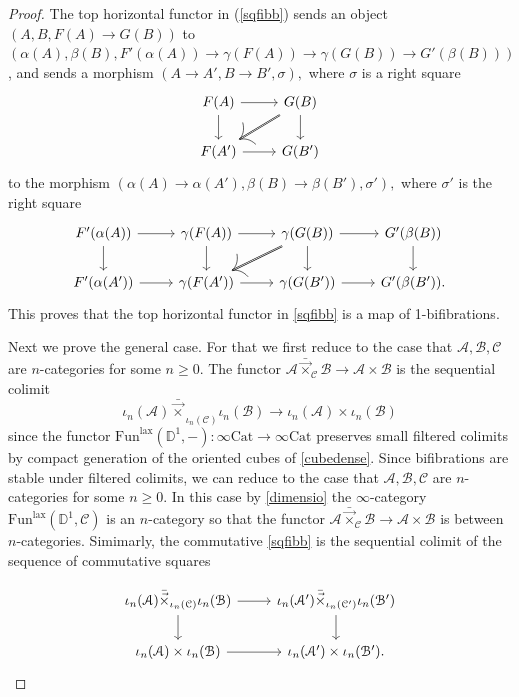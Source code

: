 \documentclass[10pt,oneside]{article}
\numberwithin{equation}{section} %
\numberwithin{figure}{section} %
\theoremstyle{plain}
\theoremstyle{definition}
\newcommand{\bD}{{\mathbb D}}
\newcommand{\mA}{{\mathcal A}}
\newcommand{\mB}{{\mathcal B}}
\newcommand{\mC}{{\mathcal C}}
\newcommand{\n}{{n}}
\newcommand{\Cat}{\mathrm{Cat}}
\newcommand{\Fun}{\mathrm{Fun}}
\newcommand{\lax}{{\mathrm{lax}}}
\begin{document}
\begin{proof}
The top horizontal functor in (\ref{sqfibb})
sends an object $(A,B,F(A) \to G(B))$ to $(\alpha(A),\beta(B),F'(\alpha(A)) \to \gamma(F(A)) \to \gamma(G(B)) \to G'(\beta(B)))$, and sends a morphism 
$ (A \to A', B \to B', \sigma),$ where $\sigma$ is a right square
\begin{equation}\label{orsqu}
\begin{tikzcd}
F(A) \ar{r}{} \ar{d}[swap]{} & G(B) \ar[double]{dl}{} \ar{d}{} \\
F(A')  \ar{r}[swap]{} & G(B')
\end{tikzcd}
\end{equation}
to the morphism $ (\alpha(A) \to \alpha(A'), \beta(B) \to \beta(B'), \sigma'),$ where $\sigma'$ is the right square
$$
\begin{tikzcd}
F'(\alpha(A)) \ar{r}{} \ar{d}[swap]{} & \gamma(F(A)) \ar{r}{} \ar{d}[swap]{} & \gamma(G(B)) \ar[double]{dl}{} \ar{d}{} \ar{r}{} & G'(\beta(B)) \ar{d}{} \\
F'(\alpha(A')) \ar{r}[swap]{} & \gamma(F(A')) \ar{r}[swap]{} & \gamma(G(B')) \ar{r}[swap]{} & G'(\beta(B')).
\end{tikzcd}
$$
This proves that the top horizontal functor in \ref{sqfibb} 
is a map of 1-bifibrations.

Next we prove the general case. For that we first reduce to the case that $\mA, \mB, \mC$ are $n$-categories for some $\n \geq 0.$
The functor $ \mA {\bar{\vec{\times}}}_{\mC} \mB \to \mA \times \mB$ is the sequential colimit
$$ {\iota_n(\mA) {\bar{\vec{\times}}}}_{\iota_n(\mC)} \iota_n(\mB) \to \iota_n(\mA) \times \iota_n(\mB) $$
since the functor $\Fun^\lax(\bD^1,-): \infty\Cat \to \infty\Cat$ preserves small filtered colimits by compact generation of the oriented cubes of \cref{cubedense}.
Since bifibrations are stable under filtered colimits, we can reduce to the case that $\mA,\mB,\mC $ are $n$-categories for some $\n \geq 0$.
In this case by \cref{dimensio} the $\infty$-category $\Fun^\lax(\bD^1,\mC) $ is an $n$-category so that the functor
$ \mA {\bar{\vec{\times}}}_{\mC} \mB \to \mA \times \mB$ is between $n$-categories.
Simimarly, the commutative \ref{sqfibb} is the sequential colimit of the sequence of commutative squares

$$
\begin{tikzcd}
{\iota_n(\mA) {{\bar{\vec{\times}}}}_{\iota_n(\mC)} \iota_n(\mB)} \ar{r}{} \ar{d}[swap]{} & {\iota_n(\mA') {{\bar{\vec{\times}}}}_{\iota_n(\mC')} \iota_n(\mB')} \ar{d}{} \\
\iota_n(\mA) \times \iota_n(\mB)  \ar{r}[swap]{} & \iota_n(\mA') \times \iota_n(\mB').
\end{tikzcd}
$$


\end{proof}
\end{document}
